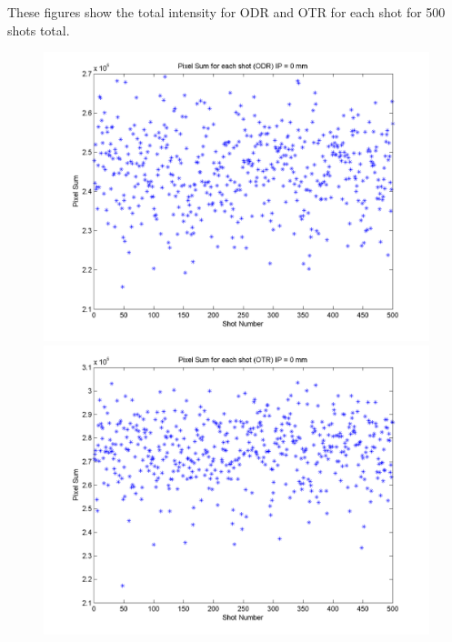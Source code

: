 \documentclass[12pt]{article}
\begin{document}
These figures show the total intensity for ODR and OTR for each shot for 500 shots total.

\begin{figure}
\begin{center}
\includegraphics[scale=0.5]{Figures/PixelSum_ODR_0.PNG}
\includegraphics[scale=0.5]{Figures/PixelSum_OTR_0.PNG}
\caption{}
\end{center}
\end{figure}
\end{document}
